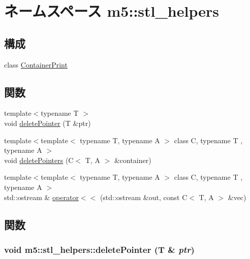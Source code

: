 \hypertarget{namespacem5_1_1stl__helpers}{
\section{ネームスペース m5::stl\_\-helpers}
\label{namespacem5_1_1stl__helpers}
}
\subsection*{構成}
\begin{DoxyCompactItemize}
\item 
class \hyperlink{classm5_1_1stl__helpers_1_1ContainerPrint}{ContainerPrint}
\end{DoxyCompactItemize}
\subsection*{関数}
\begin{DoxyCompactItemize}
\item 
{\footnotesize template$<$typename T $>$ }\\void \hyperlink{namespacem5_1_1stl__helpers_af96752cbf82aaccfe191b44be2722265}{deletePointer} (T \&ptr)
\item 
{\footnotesize template$<$template$<$ typename T, typename A $>$ class C, typename T , typename A $>$ }\\void \hyperlink{namespacem5_1_1stl__helpers_a789891cb80a549639c232ca96afb3fe1}{deletePointers} (C$<$ T, A $>$ \&container)
\item 
{\footnotesize template$<$template$<$ typename T, typename A $>$ class C, typename T , typename A $>$ }\\std::ostream \& \hyperlink{namespacem5_1_1stl__helpers_acd4af6db82f09f20c07d0055dd78e2eb}{operator$<$$<$} (std::ostream \&out, const C$<$ T, A $>$ \&vec)
\end{DoxyCompactItemize}


\subsection{関数}
\hypertarget{namespacem5_1_1stl__helpers_af96752cbf82aaccfe191b44be2722265}{
\subsubsection[{deletePointer}]{\setlength{\rightskip}{0pt plus 5cm}void m5::stl\_\-helpers::deletePointer (T \& {\em ptr})}}
\label{namespacem5_1_1stl__helpers_af96752cbf82aaccfe191b44be2722265}



